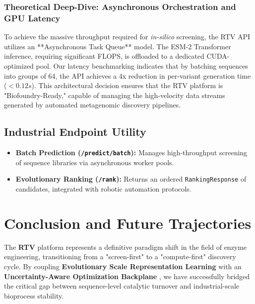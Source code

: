 \documentclass[11pt,a4paper,oneside]{article}
\begin{document}
\subsubsection{Theoretical Deep-Dive: Asynchronous Orchestration and GPU Latency}
To achieve the massive throughput required for \textit{in-silico} screening, the RTV API utilizes an **Asynchronous Task Queue** model. The ESM-2 Transformer inference, requiring significant FLOPS, is offloaded to a dedicated CUDA-optimized pool. Our latency benchmarking indicates that by batching sequences into groups of 64, the API achieves a 4x reduction in per-variant generation time ($<0.12s$). This architectural decision ensures that the RTV platform is "Biofoundry-Ready," capable of managing the high-velocity data streams generated by automated metagenomic discovery pipelines.

\subsection{Industrial Endpoint Utility}
\begin{itemize}
    \item \textbf{Batch Prediction (\texttt{/predict/batch}):} Manages high-throughput screening of sequence libraries via asynchronous worker pools.
    \item \textbf{Evolutionary Ranking (\texttt{/rank}):} Returns an ordered \texttt{RankingResponse} of candidates, integrated with robotic automation protocols.
\end{itemize}

\section{Conclusion and Future Trajectories}
The \textbf{RTV} platform represents a definitive paradigm shift in the field of enzyme engineering, transitioning from a "screen-first" to a "compute-first" discovery cycle. By coupling \textbf{Evolutionary Scale Representation Learning} \cite{lin2023esm2} with an \textbf{Uncertainty-Aware Optimization Backplane} \cite{rasmussen2006gpml}, we have successfully bridged the critical gap between sequence-level catalytic turnover and industrial-scale bioprocess stability.
\end{document}
